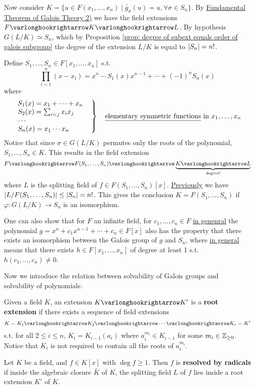 Now consider $K = \{u \in F(x_1, \dots, x_n) \mid \widetilde{g_{\sigma}}(u) = u, \forall \sigma \in S_n\}$. By \hyperref[thm: fundamental theorem of galois theory]{Fundamental Theorem of Galois Theory 2)} we have the field extensions $F \ext K \ext L$. By hypothesis $G(L/K) \simeq S_n$, which by Proposition \ref{prop: degree of subext equals order of galois subgroup} the degree of the extension $L/K$ is equal to $\left|S_n\right| = n!$.

Define $S_1, \dots, S_n \in F[x_1, \dots, x_n]$ s.t. 
\[
    \prod_{i = 1}^n (x - x_i) = x^n - S_1(x) x^{n-1} + \cdots + (-1)^n S_n(x)
\]
where
\[
    \left.
    \begin{array}{l}
        S_1(x) = x_1 + \cdots + x_n \\
        S_2(x) = \sum_{i < j} x_i x_j\\
        \cdots \\
        S_n(x) = x_1 \cdots x_n
    \end{array}
    \ \ 
    \right\}
    \quad
    \text{\underline{elementary symmetric functions} in } x_1, \dots, x_n
\]
Notice that since $\sigma \in G(L/K)$ permutes only the roots of the polynomial, $S_1, \dots, S_n \in K$. This results in the field extension
\[
    F \ext F(S_1, \dots, S_n) \ext \underbrace{K \ext L}_{\deg = n!}
\]
where $L$ is the splitting field of $f \in F(S_1, \dots, S_n)[x]$. \hyperref[goto: order of galois group bounded by order of Sn]{Previously} we have $\left|L/F(S_1, \dots, S_n)\right| \leq \left|S_n\right| = n!$. This gives the conclusion $K = F(S_1, \dots, S_n)$ if $\varphi: G(L/K) \to S_n$ is an isomorphism.

\begin{remark}
    One can also show that for $F$ an infinite field, for $c_1, \dots, c_n \in F$ \underline{in genenral} the polynomial $g = x^n + c_1 x^{n-1} + \cdots + c_n \in F[x]$ also has the property that there exists an isomorphism between the Galois group of $g$ and $S_n$, where \underline{in general} means that there exists $h \in F[x_1, \dots, x_n]$ of degree at least 1 s.t. $h(c_1, \dots, c_n) \neq 0$.
\end{remark}

\textstart
Now we introduce the relation between solvability of Galois groups and solvability of polynomials:

\begin{definition}
    Given a field $K$, an extension $K \ext K'$ is a \textbf{root extension} if there exists a sequence of field extensions
    \[
        K = K_1 \ext K_2 \ext \cdots \ext K_r = K'
    \]
    s.t. for all $2 \leq i \leq n$, $K_i = K_{i-1}(a_i)$ where $a_i^{m_i} \in K_{i-1}$ for some $m_i \in \mathbb{Z}_{\geq 0}$. Notice that $K_i$ is not required to contain all the roots of $a_i^{m_i}$.
\end{definition}
\nogap
\begin{definition}
    Let $K$ be a field, and $f \in K[x]$ with $\deg f \geq 1$. Then $f$ is \textbf{resolved by radicals} if inside the algebraic closure $\bar{K}$ of $K$, the splitting field $L$ of $f$ lies inside a root extension $K'$ of $K$.
\end{definition}

